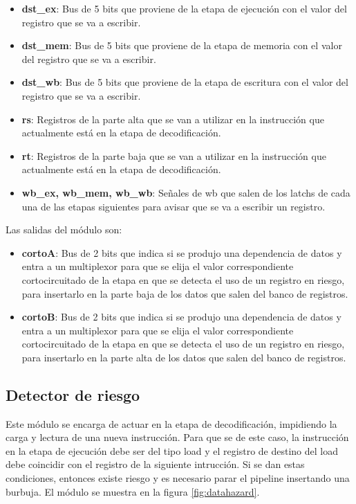 \begin{itemize}
  \item \textbf{dst\_ex}: Bus de 5 bits que proviene de la etapa de ejecuci\'on con el valor del registro que se va a escribir.
  \item \textbf{dst\_mem}: Bus de 5 bits que proviene de la etapa de memoria	con el valor del registro que se va a escribir.
  \item \textbf{dst\_wb}: Bus de 5 bits que proviene de la etapa de escritura con el valor del registro que se va a escribir.
  \item \textbf{rs}: Registros de la parte alta que se van a utilizar en la instrucci\'on que actualmente est\'a en la etapa de decodificaci\'on.
  \item \textbf{rt}: Registros de la parte baja que se van a utilizar en la instrucci\'on que actualmente est\'a en la etapa de decodificaci\'on.
  \item \textbf{wb\_ex, wb\_mem, wb\_wb}: Señales de wb que salen de los latchs de cada una de las etapas siguientes para avisar que se va a escribir un registro.  
\end{itemize}

Las salidas del m\'odulo son:
\begin{itemize}
  \item \textbf{cortoA}: Bus de 2 bits que indica si se produjo una dependencia de datos y entra a un multiplexor para que se elija el valor correspondiente cortocircuitado de la etapa en que se detecta el uso de un registro en riesgo, para insertarlo en la parte baja de los datos que salen del banco de registros. 
  \item \textbf{cortoB}: Bus de 2 bits que indica si se produjo una dependencia de datos y entra a un multiplexor para que se elija el valor correspondiente cortocircuitado de la etapa en que se detecta el uso de un registro en riesgo, para insertarlo en la parte alta de los datos que salen del banco de registros.
\end{itemize}

\subsection{Detector de riesgo}

Este m\'odulo se encarga de actuar en la etapa de decodificaci\'on, impidiendo la carga y lectura de una nueva instrucci\'on. Para que se de este caso, la instrucci\'on en la etapa de ejecuci\'on debe ser del tipo load y el registro de destino del load debe coincidir con el registro de la siguiente intrucci\'on. Si se dan estas condiciones, entonces existe riesgo y es necesario parar el pipeline insertando una burbuja. El m\'odulo se muestra en la figura \ref{fig:datahazard}.

